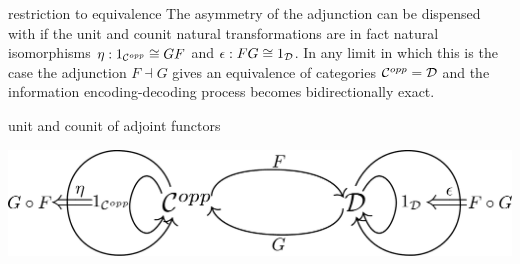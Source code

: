 \begin{frame}
\begin{block}{restriction to equivalence}
The asymmetry of the adjunction can be dispensed with if the unit and counit natural transformations are in fact natural isomorphisms $\eta: 1_{{\mathcal C}^{opp}} \cong GF$ and $\epsilon: FG \cong 1_{{\mathcal D}}$. In any limit in which this is the case the adjunction $F \dashv G$ gives an equivalence of categories ${\mathcal C}^{opp} = {\mathcal D}$ and the information encoding-decoding process becomes bidirectionally exact.
\end{block}
\begin{block}{unit and counit of adjoint functors}
\begin{center}
\includegraphics[width=0.9\framewidth]{fig/adjunction.pdf}
\end{center}
\end{block}
\end{frame}